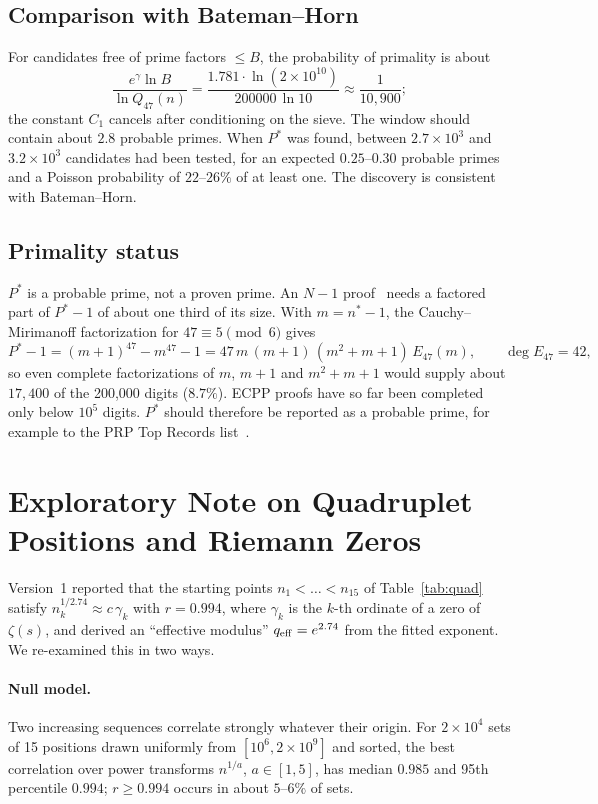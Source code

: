 \documentclass[11pt,a4paper]{article}
\theoremstyle{remark}
\begin{document}
\subsection{Comparison with Bateman--Horn}
For candidates free of prime factors $\le B$, the probability of primality is about
\[
\frac{e^\gamma\ln B}{\ln Q_{47}(n)}=\frac{1.781\cdot\ln(2\times10^{10})}{200000\,\ln10}\approx \frac{1}{10{,}900};
\]
the constant $C_1$ cancels after conditioning on the sieve. The window should contain about $2.8$ probable primes. When $P^\ast$ was found, between $2.7\times10^3$ and $3.2\times10^3$ candidates had been tested, for an expected $0.25$--$0.30$ probable primes and a Poisson probability of $22$--$26\%$ of at least one. The discovery is consistent with Bateman--Horn.

\subsection{Primality status}
$P^\ast$ is a probable prime, not a proven prime. An $N-1$ proof~\cite{BLS} needs a factored part of $P^\ast-1$ of about one third of its size. With $m=n^\ast-1$, the Cauchy--Mirimanoff factorization for $47\equiv5\pmod6$ gives
\[
P^\ast-1=(m+1)^{47}-m^{47}-1=47\,m\,(m+1)\,(m^2+m+1)\,E_{47}(m),\qquad \deg E_{47}=42,
\]
so even complete factorizations of $m$, $m+1$ and $m^2+m+1$ would supply about $17{,}400$ of the 200,000 digits ($8.7\%$). ECPP proofs have so far been completed only below $10^5$ digits. $P^\ast$ should therefore be reported as a probable prime, for example to the PRP Top Records list~\cite{PRPtop}.

\section{Exploratory Note on Quadruplet Positions and Riemann Zeros}\label{sec:riemann}
Version~1 reported that the starting points $n_1<\dots<n_{15}$ of Table~\ref{tab:quad} satisfy $n_k^{1/2.74}\approx c\,\gamma_k$ with $r=0.994$, where $\gamma_k$ is the $k$-th ordinate of a zero of $\zeta(s)$, and derived an ``effective modulus'' $q_{\rm eff}=e^{2.74}$ from the fitted exponent. We re-examined this in two ways.

\paragraph{Null model.} Two increasing sequences correlate strongly whatever their origin. For $2\times10^4$ sets of 15 positions drawn uniformly from $[10^6,2\times10^9]$ and sorted, the best correlation over power transforms $n^{1/a}$, $a\in[1,5]$, has median $0.985$ and 95th percentile $0.994$; $r\ge0.994$ occurs in about $5$--$6\%$ of sets.
\end{document}
